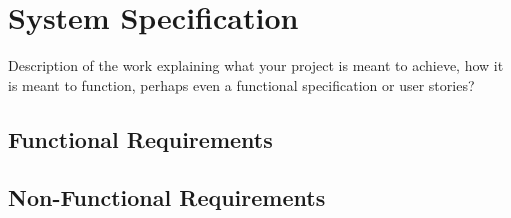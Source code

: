 \section{System Specification}
\label{sec:spec}

{\color{red} Description of the work explaining what your project is meant to achieve, how it is meant to function, perhaps even a functional specification or user stories?}
	\subsection{Functional Requirements}
	\subsection{Non-Functional Requirements}